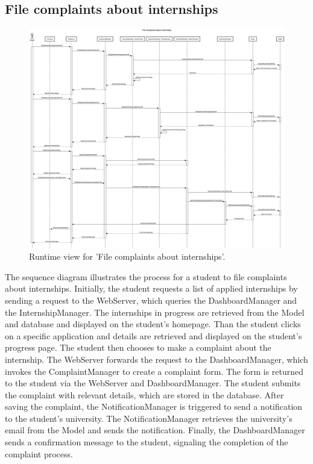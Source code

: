 \subsection{File complaints about internships}
\begin{figure}[H]
    \begin{center}
        \includegraphics[width=0.8\linewidth]{DD/LaTeX/Images/RuntimeView/FileComplaintsAboutInternships.png}
        \caption{Runtime view for 'File complaints about internships'.}
        \label{fig:runtime_FileComplaintsAboutInternships}%
    \end{center}
\end{figure}

The sequence diagram illustrates the process for a student to file complaints about internships. Initially, the student requests a list of applied internships by sending a request to the WebServer, which queries the DashboardManager and the InternshipManager. The internships in progress are retrieved from the Model and database and displayed on the student's homepage. Than the student clicks on a specific application and details are retrieved and displayed on the student's progress page. The student then chooses to make a complaint about the internship. The WebServer forwards the request to the DashboardManager, which invokes the ComplaintManager to create a complaint form. The form is returned to the student via the WebServer and DashboardManager. The student submits the complaint with relevant details, which are stored in the database. After saving the complaint, the NotificationManager is triggered to send a notification to the student's university. The NotificationManager retrieves the university's email from the Model and sends the notification. Finally, the DashboardManager sends a confirmation message to the student, signaling the completion of the complaint process.

